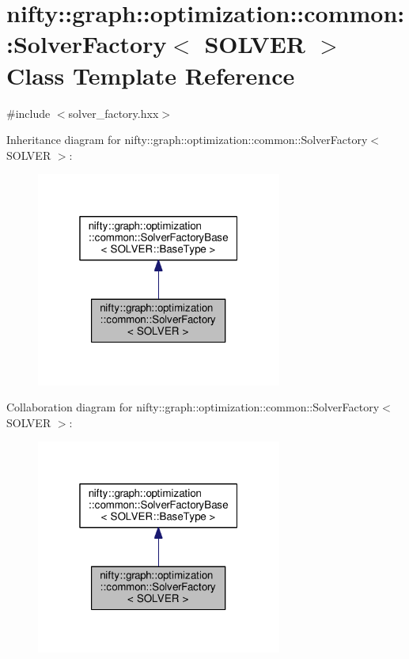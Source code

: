 \hypertarget{classnifty_1_1graph_1_1optimization_1_1common_1_1SolverFactory}{}\section{nifty\+:\+:graph\+:\+:optimization\+:\+:common\+:\+:Solver\+Factory$<$ S\+O\+L\+V\+E\+R $>$ Class Template Reference}
\label{classnifty_1_1graph_1_1optimization_1_1common_1_1SolverFactory}


{\ttfamily \#include $<$solver\+\_\+factory.\+hxx$>$}



Inheritance diagram for nifty\+:\+:graph\+:\+:optimization\+:\+:common\+:\+:Solver\+Factory$<$ S\+O\+L\+V\+E\+R $>$\+:\nopagebreak
\begin{figure}[H]
\begin{center}
\leavevmode
\includegraphics[width=229pt]{classnifty_1_1graph_1_1optimization_1_1common_1_1SolverFactory__inherit__graph}
\end{center}
\end{figure}


Collaboration diagram for nifty\+:\+:graph\+:\+:optimization\+:\+:common\+:\+:Solver\+Factory$<$ S\+O\+L\+V\+E\+R $>$\+:\nopagebreak
\begin{figure}[H]
\begin{center}
\leavevmode
\includegraphics[width=229pt]{classnifty_1_1graph_1_1optimization_1_1common_1_1SolverFactory__coll__graph}
\end{center}
\end{figure}

